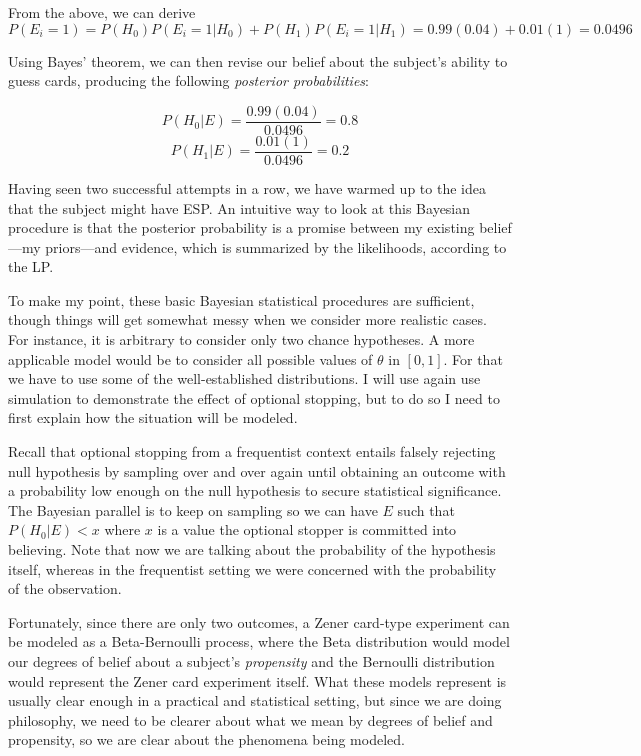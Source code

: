 From the above, we can derive
\[P(E_i = 1) = P(H_0)P(E_i=1|H_0) + P(H_1)P(E_i=1|H_1) = 0.99(0.04)+0.01(1) = 0.0496\]

Using Bayes' theorem, we can then revise our belief about the subject's
ability to guess cards, producing the following \emph{posterior
probabilities}:

\[P(H_0|E) = \frac{0.99(0.04)}{0.0496} = 0.8\]
\[P(H_1|E) = \frac{0.01(1)}{0.0496} = 0.2\]

Having seen two successful attempts in a row, we have warmed up to the
idea that the subject might have ESP. An intuitive way to look at this
Bayesian procedure is that the posterior probability is a promise
between my existing belief---my priors---and evidence, which is
summarized by the likelihoods, according to the LP.

To make my point, these basic Bayesian statistical procedures are
sufficient, though things will get somewhat messy when we consider more
realistic cases. For instance, it is arbitrary to consider only two
chance hypotheses. A more applicable model would be to consider all
possible values of \(\theta\) in \([0,1]\). For that we have to use some
of the well-established distributions. I will use again use simulation
to demonstrate the effect of optional stopping, but to do so I need to first explain
how the situation will be modeled.

Recall that optional stopping from a frequentist context entails
falsely rejecting null hypothesis by sampling over and over again until
obtaining an outcome with a probability low enough on the null
hypothesis to secure statistical significance. The Bayesian parallel is
to keep on sampling so we can have \(E\) such that \(P(H_0|E) < x\)
where \(x\) is a value the optional stopper is committed into believing.
Note that now we are talking about the probability of the hypothesis
itself, whereas in the frequentist setting we were concerned with the
probability of the observation.

Fortunately, since there are only two outcomes, a Zener card-type
experiment can be modeled as a Beta-Bernoulli process, where the Beta
distribution would model our degrees of belief about a subject's
\emph{propensity} and the Bernoulli distribution would represent the
Zener card experiment itself. What these models represent is usually
clear enough in a practical and statistical setting, but since we are doing philosophy, we need to be clearer about what we mean by
degrees of belief and propensity, so we are clear about the phenomena being
modeled.

